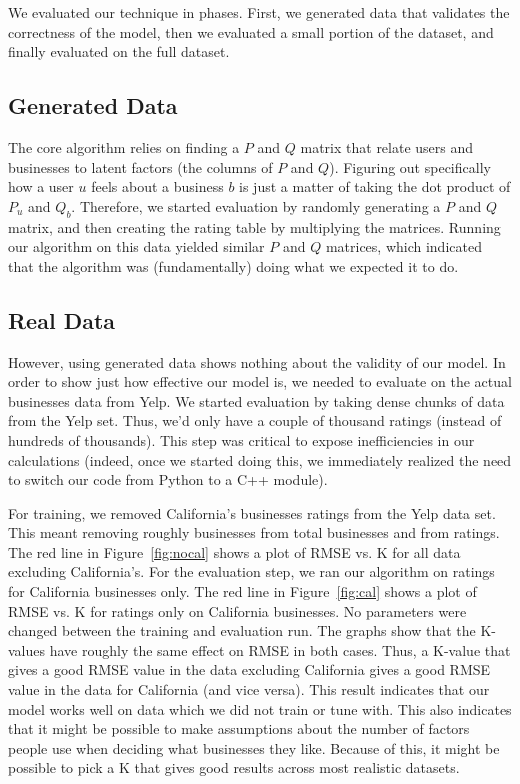 We evaluated our technique in phases. First, we generated data that
validates the correctness of the model, then we evaluated a small portion of
the dataset, and finally evaluated on the full dataset.

\subsection{Generated Data}
The core algorithm relies on finding a $P$ and $Q$ matrix that relate users and
businesses to latent factors (the columns of $P$ and $Q$).  Figuring out
specifically how a user $u$ feels about a business $b$ is just a matter of
taking the dot product of $P_u$ and $Q_b$.  Therefore, we started evaluation by
randomly generating a $P$ and $Q$ matrix, and then creating the rating table
by multiplying the matrices. Running our algorithm on this data yielded similar
$P$ and $Q$ matrices, which indicated that the algorithm was (fundamentally) doing
what we expected it to do.

\subsection{Real Data}
However, using generated data shows nothing about the validity of our model. In
order to show just how effective our model is, we needed to evaluate on
the actual businesses data from Yelp. We started evaluation by taking dense
chunks of data from the Yelp set. Thus, we'd only have a couple of thousand
ratings (instead of hundreds of thousands).  This step was critical to expose
inefficiencies in our calculations (indeed, once we started doing this, we
immediately realized the need to switch our code from Python to a C++ module).

For training, we removed California's businesses ratings from the Yelp data
set. This meant removing roughly \numBusCA businesses from \numBusTotal total
businesses and \numRatingCA from \numRatingTotal ratings.
The red line in Figure~\ref{fig:nocal} shows a plot of RMSE vs. K for all data excluding
California's. For the evaluation step, we ran our algorithm on ratings for
California businesses only. The red line in Figure~\ref{fig:cal} shows a plot of RMSE vs. K for
ratings only on California businesses. No parameters were changed between the
training and evaluation run. The graphs show that the K-values have roughly the
same effect on RMSE in both cases. Thus, a K-value that gives a good RMSE value
in the data excluding California gives a good RMSE value in the data for
California (and vice versa). This result indicates that our model works well on
data which we did not train or tune with. This also indicates that it might be
possible to make assumptions about the number of factors people use when
deciding what businesses they like. Because of this, it might be possible to
pick a K that gives good results across most realistic datasets.

